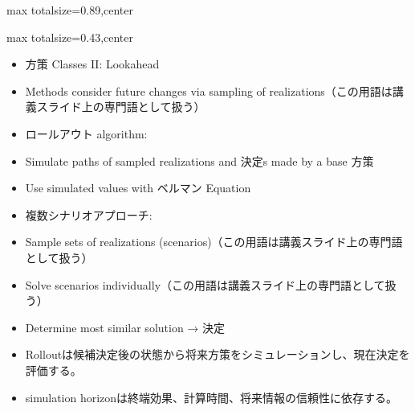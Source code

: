\begin{minipage}[t]{0.58\textwidth}
\begin{adjustbox}{max totalsize={\textwidth}{0.89\textheight},center}
\begin{minipage}{\textwidth}
\end{minipage}
\end{adjustbox}
\end{minipage}


\clearpage
{}
\begin{minipage}[t]{0.405\textwidth}
\begin{adjustbox}{max totalsize={\textwidth}{0.43\textheight},center}
\begin{minipage}{\textwidth}\scriptsize
{}\begin{itemize}
\item 方策 Classes II: Lookahead
\item Methods consider future changes via sampling of realizations（この用語は講義スライド上の専門語として扱う）
\item ロールアウト algorithm:
\item Simulate paths of sampled realizations and 決定s made by a base 方策
\item Use simulated values with ベルマン Equation
\item 複数シナリオアプローチ:
\item Sample sets of realizations (scenarios)（この用語は講義スライド上の専門語として扱う）
\item Solve scenarios individually（この用語は講義スライド上の専門語として扱う）
\item Determine most similar solution → 決定
\end{itemize}\begin{itemize}
\item Rolloutは候補決定後の状態から将来方策をシミュレーションし、現在決定を評価する。
\item simulation horizonは終端効果、計算時間、将来情報の信頼性に依存する。
\end{itemize}
\end{minipage}
\end{adjustbox}
\end{minipage}\hfill
